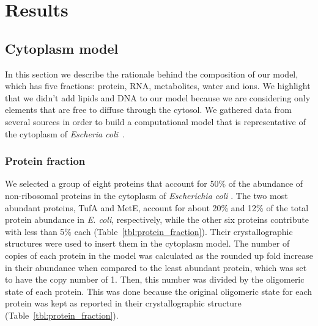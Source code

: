 \documentclass[journal=jacsat,manuscript=article]{achemso}
\begin{document}
\section*{Results}

\subsection{Cytoplasm model}
In this section we describe the rationale behind the composition of our model, which has five fractions: protein, RNA, metabolites, water and ions. We highlight that we didn't add lipids and DNA to our model because we are considering only elements that are free to diffuse through the cytosol. We gathered data from several sources in order to build a computational model that is representative of the cytoplasm of {\em Escheria coli}~\cite{Dong1996,Bennett2009,Link1997,Mcguffee2010}.

\subsubsection{Protein fraction}
We selected a group of eight proteins that account for 50\% of the abundance of non-ribosomal proteins in the cytoplasm of {\em Escherichia coli} \cite{Link1997}. The two most abundant proteins, TufA and MetE, account for about 20\% and 12\% of the total protein abundance in {\em E. coli}, respectively, while the other six proteins contribute with less than 5\% each (Table~\ref{tbl:protein_fraction}). Their crystallographic structures were used to insert them in the cytoplasm model. The number of copies of each protein in the model was calculated as the rounded up fold increase in their abundance when compared to the least abundant protein, which was set to have the copy number of 1. Then, this number was divided by the oligomeric state of each protein. This was done because the original oligomeric state for each protein was kept as reported in their crystallographic structure (Table~\ref{tbl:protein_fraction}).
\end{document}
